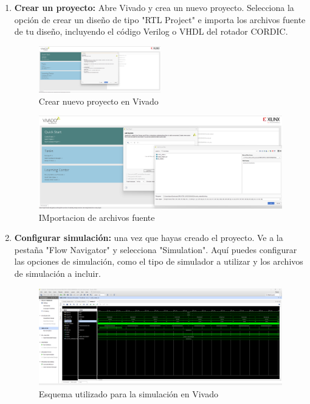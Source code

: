 \documentclass[12pt,a4paper, twoside]{article} %
\begin{document}
\begin{enumerate}
    \item \textbf{Crear un proyecto:} Abre Vivado y crea un nuevo proyecto. Selecciona la opción de crear un diseño de tipo "RTL Project" e importa los archivos fuente de tu diseño, incluyendo el código Verilog o VHDL del rotador CORDIC.

    \begin{figure}[ht]
    \centering
    \includegraphics[width=0.5\textwidth,natwidth=10,natheight=14]{./Figuras/New_project.png}
    \caption{Crear nuevo proyecto en Vivado}
    \label{fig:esquema}
    \end{figure}   
    
    \begin{figure}[ht]
    \centering
    \includegraphics[width=1\textwidth,natwidth=610,natheight=642]{./Figuras/add_source.png}
    \caption{IMportacion de archivos fuente}
    \label{fig:esquema}
    \end{figure} 
    
   
    
    \item \textbf{Configurar simulación:} una vez que hayas creado el proyecto. Ve a la pestaña "Flow Navigator" y selecciona "Simulation". Aquí puedes configurar las opciones de simulación, como el tipo de simulador a utilizar y los archivos de simulación a incluir.
    
    \begin{figure}[ht]
    \centering
    \includegraphics[width=1\textwidth]{./Figuras/Run_simulacion_visual.png}
    \caption{Esquema utilizado para la simulación en Vivado}
    \label{fig:esquema}
    \end{figure}
    

\end{enumerate}
\end{document}

